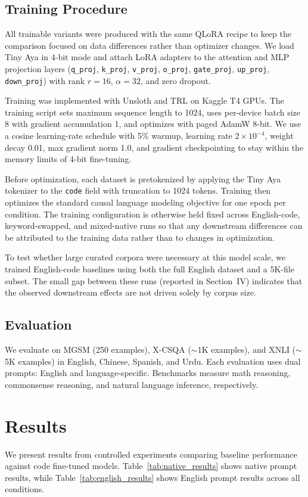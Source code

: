 \documentclass[conference]{IEEEtran}
\begin{document}
\subsection{Training Procedure}
All trainable variants were produced with the same QLoRA recipe to keep the comparison focused on data differences rather than optimizer changes. We load Tiny Aya in 4-bit mode and attach LoRA adapters to the attention and MLP projection layers (\texttt{q\_proj}, \texttt{k\_proj}, \texttt{v\_proj}, \texttt{o\_proj}, \texttt{gate\_proj}, \texttt{up\_proj}, \texttt{down\_proj}) with rank $r=16$, $\alpha=32$, and zero dropout.

Training was implemented with Unsloth and TRL on Kaggle T4 GPUs. The training script sets maximum sequence length to 1024, uses per-device batch size 8 with gradient accumulation 1, and optimizes with paged AdamW 8-bit. We use a cosine learning-rate schedule with 5\% warmup, learning rate $2\times10^{-4}$, weight decay 0.01, max gradient norm 1.0, and gradient checkpointing to stay within the memory limits of 4-bit fine-tuning.

Before optimization, each dataset is pretokenized by applying the Tiny Aya tokenizer to the \texttt{code} field with truncation to 1024 tokens. Training then optimizes the standard causal language modeling objective for one epoch per condition. The training configuration is otherwise held fixed across English-code, keyword-swapped, and mixed-native runs so that any downstream differences can be attributed to the training data rather than to changes in optimization.

To test whether large curated corpora were necessary at this model scale, we trained English-code baselines using both the full English dataset and a 5K-file subset. The small gap between these runs (reported in Section~IV) indicates that the observed downstream effects are not driven solely by corpus size.

\subsection{Evaluation}
We evaluate on MGSM (250 examples), X-CSQA ($\sim$1K examples), and XNLI ($\sim$5K examples) in English, Chinese, Spanish, and Urdu. Each evaluation uses dual prompts: English and language-specific. Benchmarks measure math reasoning, commonsense reasoning, and natural language inference, respectively.

\section{Results}
We present results from controlled experiments comparing baseline performance against code fine-tuned models. Table~\ref{tab:native_results} shows native prompt results, while Table~\ref{tab:english_results} shows English prompt results across all conditions.
\end{document}
